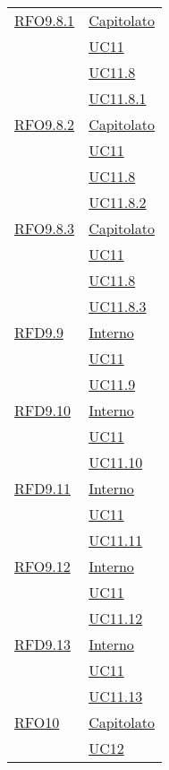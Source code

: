 \begin{longtable}{|>{\centering}m{5cm}|m{5cm}<{\centering}|}
\hyperlink{RFO9.8.1}{RFO9.8.1} 
  & \hyperlink{Capitolato}{Capitolato}\\
& \hyperref[UC11]{UC11}\\
& \hyperref[UC11.8]{UC11.8}\\
& \hyperref[UC11.8.1]{UC11.8.1}\\\hline

\hyperlink{RFO9.8.2}{RFO9.8.2} 
  & \hyperlink{Capitolato}{Capitolato}\\
& \hyperref[UC11]{UC11}\\
& \hyperref[UC11.8]{UC11.8}\\
& \hyperref[UC11.8.2]{UC11.8.2}\\\hline

\hyperlink{RFO9.8.3}{RFO9.8.3} 
  & \hyperlink{Capitolato}{Capitolato}\\
& \hyperref[UC11]{UC11}\\
& \hyperref[UC11.8]{UC11.8}\\
& \hyperref[UC11.8.3]{UC11.8.3}\\\hline

  \hyperlink{RFD9.9}{RFD9.9} 
  & \hyperlink{Interno}{Interno}\\
& \hyperref[UC11]{UC11}\\
& \hyperref[UC11.9]{UC11.9}\\\hline

 \hyperlink{RFD9.10}{RFD9.10} 
  & \hyperlink{Interno}{Interno}\\
& \hyperref[UC11]{UC11}\\
& \hyperref[UC11.10]{UC11.10}\\\hline

 \hyperlink{RFD9.11}{RFD9.11} 
  & \hyperlink{Interno}{Interno}\\
& \hyperref[UC11]{UC11}\\
& \hyperref[UC11.11]{UC11.11}\\\hline

  \hyperlink{RFO9.12}{RFO9.12} 
  & \hyperlink{Interno}{Interno}\\
& \hyperref[UC11]{UC11}\\
& \hyperref[UC11.12]{UC11.12}\\\hline

  \hyperlink{RFD9.13}{RFD9.13} 
  & \hyperlink{Interno}{Interno}\\
& \hyperref[UC11]{UC11}\\
& \hyperref[UC11.13]{UC11.13}\\\hline

  \hyperlink{RFO10}{RFO10} 
  & \hyperlink{Capitolato}{Capitolato}\\
& \hyperref[UC12]{UC12}\\\hline


\end{longtable}
